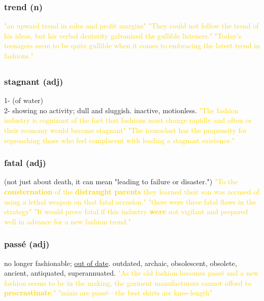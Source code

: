 \documentclass{proc}
\begin{document}
	\subsubsection{\textcolor{brickred}{trend} (n)}
	\textcolor{gold}{"an upward trend in sales and profit margins" "They could not follow the trend of his ideas, but his verbal dexterity galvanized the gullible listeners." "Today's teenagers seem to be quite gullible when it comes to embracing the latest trend in fashions."}
	
	\newpage
	\subsection{}
	\subsubsection{\textcolor{brickred}{stagnant} (adj)}
	1- (of water)\\
	2- showing no activity; dull and sluggish. inactive, motionless.
	\textcolor{gold}{"The fashion industry is cognizant of the fact that fashions must change rapidly and often or their economy would become stagnant" "The iconoclast has the propensity for reproaching those who feel complacent with leading a stagnant existence."}
	
	\subsubsection{\textcolor{brickred}{fatal} (adj)}
	(not just about death, it can mean "leading to failure or disaster.")
	\textcolor{gold}{"To the \textbf{consternation} of the \textbf{distraught parents} they learned their son was accused of using a lethal weapon on that fatal occasion." "there were three fatal flaws in the strategy" "It would prove fatal if this industry \textbf{were} not vigilant and prepared well in advance for a new fashion trend."}
	
	\subsubsection{\textcolor{brickred}{passé} (adj)}
	no longer fashionable; \underline{out of date}. outdated, archaic,
	obsolescent,
	obsolete,
	ancient,
	antiquated,
	superannuated.
	\textcolor{gold}{"As the old  fashion becomes passé and a new fashion seems to be in the making, the garment manufacturers cannot afford to \textbf{procrastinate}." "minis are passé—the best skirts are knee-length"}
	
\end{document}
